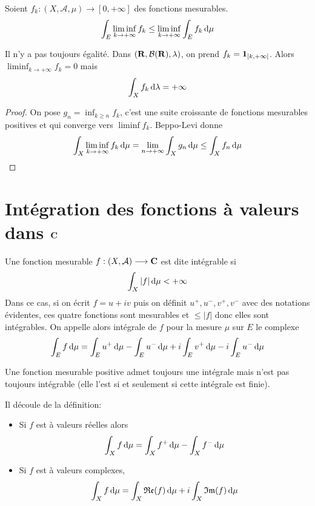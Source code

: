 \begin{lmm}
    Soient $f_k:(X, \mathcal  A, \mu)\longrightarrow [0, +\infty]$ des fonctions mesurables. \[
    \int_E \liminf_{k\to +\infty}f_k\leq \liminf_{k\to +\infty} \int_E f_k\mathop{}\!\mathrm d\mu
    \] 
\end{lmm}


\begin{rem}
    Il n'y a pas toujours égalité. Dans $(\mathbf R, \mathcal B(\mathbf R), \lambda)$, on prend $f_k=\bm{1}_{[k, +\infty[}$. Alors $\liminf_{k\to +\infty} f_k=0$ mais \[
    \int_X f_k\mathop{}\!\mathrm d\lambda=+\infty
    \] 
\end{rem}

\begin{proof}
    On pose $g_n=\inf_{k\geq n}f_k$, c'est une suite croissante de fonctions mesurables positives et qui converge vers $\liminf f_k$. Beppo-Levi donne \[\int_X\liminf_{k\to +\infty} f_k\mathop{}\!\mathrm d \mu=\lim_{n\to +\infty}\int_Xg_n\mathop{}\!\mathrm d\mu\leq \int_Xf_n\mathop{}\!\mathrm d\mu\]
\end{proof}

\section{Intégration des fonctions à valeurs dans \texorpdfstring{$\mathbf C$}{C}}

\begin{dfn}
    Une fonction mesurable $f:(X, \mathcal  A)\longrightarrow \mathbf C$ est dite intégrable si \[\int_X|f|\mathop{}\!\mathrm d\mu<+\infty\]
    Dans ce cas, si on écrit $f=u+iv$ puis on définit  $u^+, u^-, v^+, v^-$ avec des notations évidentes, ces quatre fonctions sont mesurables et  $\leq |f|$ donc elles sont intégrables. On appelle alors intégrale de $f$ pour la mesure  $\mu$ sur  $E$ le complexe \[\int_Ef\mathop{}\!\mathrm d\mu=\int_Eu^+\mathop{}\!\mathrm d\mu-\int_Eu^-\mathop{}\!\mathrm d\mu+i\int_Ev^+\mathop{}\!\mathrm d\mu-i\int_Eu^-\mathop{}\!\mathrm d\mu\]
\end{dfn}

\begin{rem}[Terminologie]
    Une fonction mesurable positive admet toujours une intégrale mais n'est pas toujours intégrable (elle l'est si et seulement si cette intégrale est finie).
\end{rem}

\begin{rem}
Il découle de la définition: \begin{itemize}
    \item Si $f$ est à valeurs réelles alors \[\int_Xf\mathop{}\!\mathrm d\mu=\int_Xf^+\mathop{}\!\mathrm d\mu-\int_Xf^-\mathop{}\!\mathrm d\mu\] 
    \item Si $f$ est à valeurs complexes, \[\int_X f\mathop{}\!\mathrm d\mu=\int_X\mathfrak{Re}(f)\mathop{}\!\mathrm d\mu+i\int_X\mathfrak{Im}(f)\mathop{}\!\mathrm d\mu\]
\end{itemize}
\end{rem}

